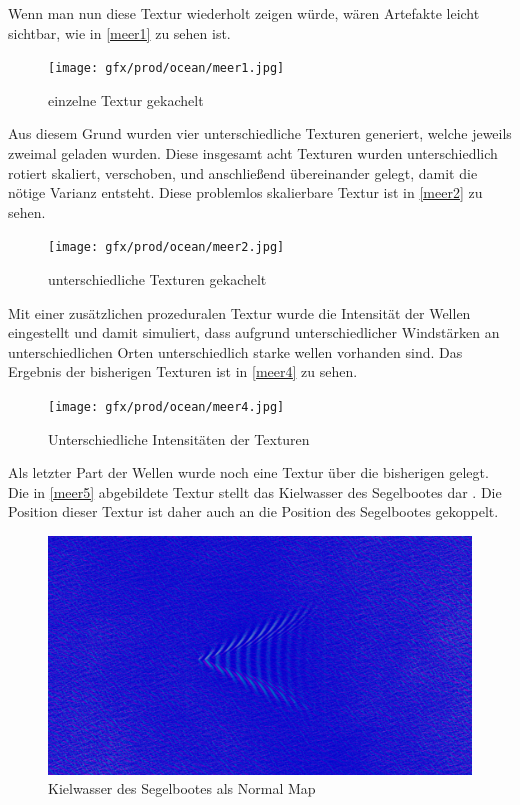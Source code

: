 Wenn man nun diese Textur wiederholt zeigen würde, wären Artefakte leicht sichtbar, wie in \autoref{meer1} zu sehen ist.

\begin{figure}[H]
\texttt{[image: gfx/prod/ocean/meer1.jpg]}
\caption{einzelne Textur gekachelt}
\label{meer1}
\end{figure}

Aus diesem Grund wurden vier unterschiedliche Texturen generiert, welche jeweils zweimal geladen wurden. Diese insgesamt acht Texturen wurden unterschiedlich rotiert skaliert, verschoben, und anschließend übereinander gelegt, damit die nötige Varianz entsteht. Diese problemlos skalierbare Textur ist in \autoref{meer2} zu sehen.

\begin{figure}[H]
\texttt{[image: gfx/prod/ocean/meer2.jpg]}
\caption{unterschiedliche Texturen gekachelt}
\label{meer2}
\end{figure}

Mit einer zusätzlichen prozeduralen Textur wurde die Intensität der Wellen eingestellt und damit simuliert, dass aufgrund unterschiedlicher Windstärken an unterschiedlichen Orten unterschiedlich starke wellen vorhanden sind. Das Ergebnis der bisherigen Texturen ist in \autoref{meer4} zu sehen.


\begin{figure}[H]
\texttt{[image: gfx/prod/ocean/meer4.jpg]}
\caption{Unterschiedliche Intensitäten der Texturen}
\label{meer4}
\end{figure}

Als letzter Part der Wellen wurde noch eine Textur über die bisherigen gelegt. Die in \autoref{meer5} abgebildete Textur stellt das Kielwasser des Segelbootes dar . Die Position dieser Textur ist daher auch an die Position des Segelbootes gekoppelt.

\begin{figure}[H]
\includegraphics[width=\textwidth]{gfx/prod/ocean/meer5.jpg}
\caption{Kielwasser des Segelbootes als Normal Map}
\label{meer5}
\end{figure}

